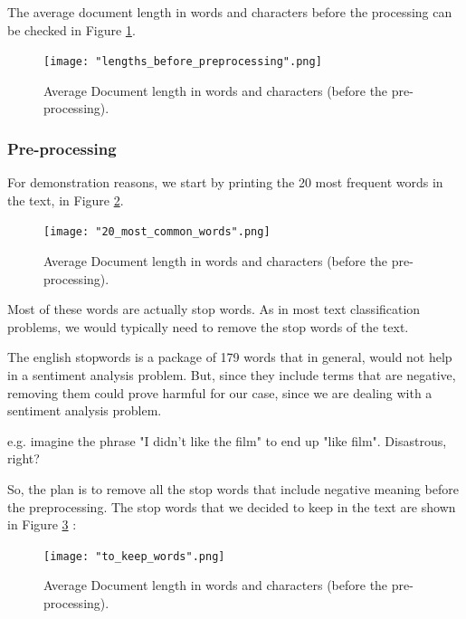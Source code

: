 \documentclass[10pt, a4paper]{article}
\begin{document}
    The average document length in words and characters before the processing can be checked in Figure \ref{fig::len_before_preprocess}.

        \begin{figure}
	    \centering
	    \texttt{[image: "lengths\_before\_preprocessing".png]}
	    \caption{Average Document length in words and characters (before the pre-processing).}
	    \label{fig::len_before_preprocess}
	\end{figure}


    \subsubsection{Pre-processing}
    
     For demonstration reasons, we start by printing the 20 most frequent words in the text, in Figure \ref{fig::20_common}.

        \begin{figure}
	    \centering
            \texttt{[image: "20\_most\_common\_words".png]}
	    \caption{Average Document length in words and characters (before the pre-processing).}
	    \label{fig::20_common}
	\end{figure}



     Most of these words are actually stop words. As in most text classification problems, we would typically need to remove the stop words of the text.
     
     The english stopwords is a package of 179 words that in general, would not help in a sentiment analysis problem. But, since they include terms that are negative, removing them could prove harmful for our case, since we are dealing with a sentiment analysis problem.

    e.g. imagine the phrase "I didn't like the film" to end up "like film". Disastrous, right?
    
    So, the plan is to remove all the stop words that include negative meaning before the preprocessing.
    The stop words that we decided to keep in the text are shown in Figure \ref{fig::to_keep} :

    \begin{figure}
	    \centering
            \texttt{[image: "to\_keep\_words".png]}
	    \caption{Average Document length in words and characters (before the pre-processing).}
	    \label{fig::to_keep}
    \end{figure}
\end{document}
